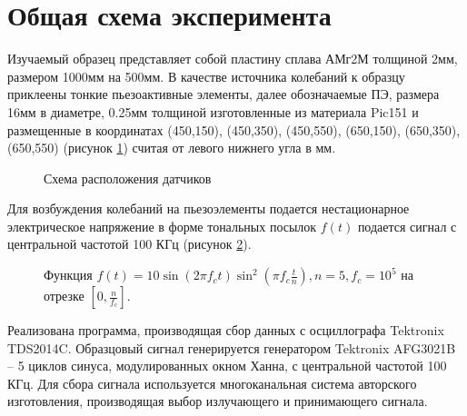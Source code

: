 \documentclass[a4paper, 12pt]{article}
\begin{document}
\section{Общая схема эксперимента}
Изучаемый образец представляет собой пластину сплава АМг2М толщиной 2мм, размером 1000мм на 500мм. В качестве источника колебаний к образцу приклеены тонкие пьезоактивные элементы, далее обозначаемые ПЭ, размера 16мм в диаметре, 0.25мм толщиной изготовленные из материала Pic151 и размещенные в координатах (450,150), (450,350), (450,550), (650,150), (650,350), (650,550) (рисунок \ref{dats}) считая от левого нижнего угла в мм.
\begin{figure}[h]
    \caption{Схема расположения датчиков}
    \label{dats}
\end{figure}
Для возбуждения колебаний на пьезоэлементы подается нестационарное электрическое напряжение в форме тональных посылок $f(t)$ подается сигнал с центральной частотой 100 КГц (рисунок \ref{window}).

    \begin{figure}[h]
        \caption{Функция $f(t)=10 \sin (2\pi f_c t) \sin^2 (\pi f_c \frac{t}{n}), n=5, f_c = 10^5$ на отрезке $[0, \frac{n}{f_c}]$.}
        \label{window}
    \end{figure}
Реализована программа, производящая сбор данных с осциллографа Tektronix TDS2014C.
Образцовый сигнал  генерируется генератором Tektronix AFG3021B – 5 циклов синуса, модулированных окном Ханна, с центральной частотой 100 КГц.
Для сбора сигнала  используется многоканальная система авторского изготовления,  производящая выбор излучающего и принимающего сигнала. 
    
\end{document}
